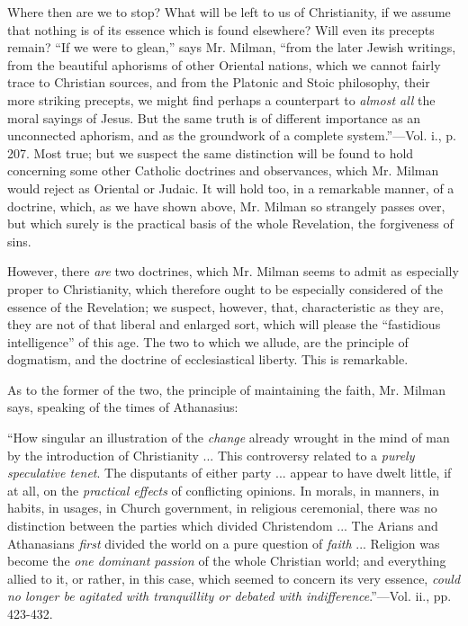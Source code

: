Where then are we to stop? What will be left to
us of Christianity, if we assume that nothing is of its essence which
is found elsewhere? Will even its precepts remain? ``If we were to
glean,'' says Mr. Milman, ``from the later Jewish writings, from the
beautiful aphorisms of other Oriental nations, which we cannot fairly
trace to Christian sources, and from the Platonic and Stoic
philosophy, their more striking precepts, we might find perhaps a
counterpart to \emph{almost all} the moral sayings of Jesus. But the
same truth is of different importance as an unconnected aphorism, and
as the groundwork of a complete system.''—Vol. i., p. 207. Most true;
but we suspect the same distinction will be found to hold concerning
some other Catholic doctrines and observances, which Mr. Milman would
reject as Oriental or Judaic. It will hold too, in a remarkable
manner, of a doctrine, which, as we have shown above, Mr. Milman so
strangely passes over, but which surely is the practical basis of the
whole Revelation, the forgiveness of sins.

However, there \emph{are} two doctrines, which
Mr. Milman seems to admit as especially proper to Christianity, which
therefore ought to be especially considered of the essence of the
Revelation; we suspect, however, that, characteristic as they are,
they are not of that liberal and enlarged sort, which will please the ``fastidious
intelligence'' of this age. The two to which we allude, are the
principle of dogmatism, and the doctrine of ecclesiastical liberty.
This is remarkable.

As to the former of the two, the principle of
maintaining the faith, Mr. Milman says, speaking of the times of
Athanasius:

``How
singular an illustration of the \emph{change} already wrought in the
mind of man by the introduction of Christianity ... This controversy
related to a \emph{purely speculative tenet}. The disputants of either
party ... appear to have dwelt little, if at all, on the \emph{practical
effects} of conflicting opinions. In morals, in manners, in habits,
in usages, in Church government, in religious ceremonial, there was no
distinction between the parties which divided Christendom ... The
Arians and Athanasians \emph{first} divided the world on a pure
question of \emph{faith} ... Religion was become the \emph{one dominant
passion} of the whole Christian world; and everything allied to it,
or rather, in this case, which seemed to concern its very essence, \emph{could
no longer be agitated with tranquillity or debated with indifference}.''—Vol.
ii., pp. 423-432.

